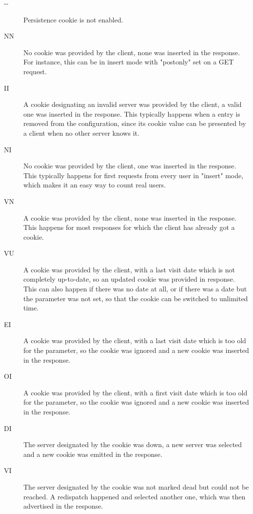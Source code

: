 \begin{description}
     \item[{-}{-}]
          Persistence cookie is not enabled.
     \item[NN]
          No cookie was provided by the client, none was inserted in the
          response. For instance, this can be in insert mode with "postonly"
          set on a GET request.
     \item[II]
          A cookie designating an invalid server was provided by the client,
          a valid one was inserted in the response. This typically happens when
          a  entry is removed from the configuration, since its cookie
          value can be presented by a client when no other server knows it.
     \item[NI]
          No cookie was provided by the client, one was inserted in the
          response. This typically happens for first requests from every user
          in "insert" mode, which makes it an easy way to count real users.
     \item[VN]
          A cookie was provided by the client, none was inserted in the
          response. This happens for most responses for which the client has
          already got a cookie.
     \item[VU]
          A cookie was provided by the client, with a last visit date which is
          not completely up-to-date, so an updated cookie was provided in
          response. This can also happen if there was no date at all, or if
          there was a date but the  parameter was not set, so that the
          cookie can be switched to unlimited time.
     \item[EI]
          A cookie was provided by the client, with a last visit date which is
          too old for the  parameter, so the cookie was ignored and a
          new cookie was inserted in the response.
     \item[OI]
          A cookie was provided by the client, with a first visit date which is
          too old for the  parameter, so the cookie was ignored and a
          new cookie was inserted in the response.
     \item[DI]
          The server designated by the cookie was down, a new server was
          selected and a new cookie was emitted in the response.
     \item[VI]
          The server designated by the cookie was not marked dead but could not
          be reached. A redispatch happened and selected another one, which was
          then advertised in the response.
\end{description}

